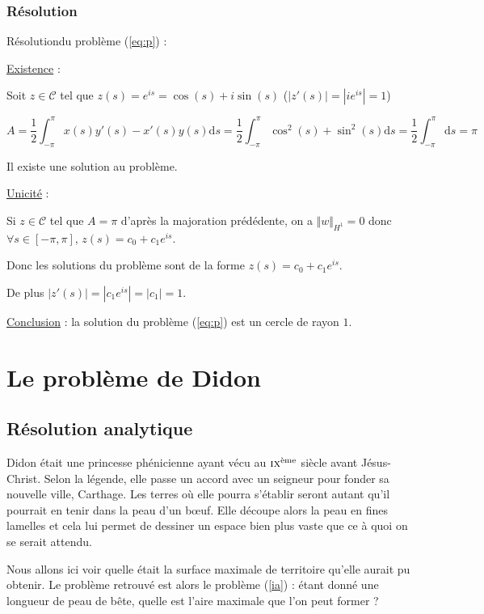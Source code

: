 \documentclass[10pt,a4paper]{article}
\renewcommand{\d}{\mathrm{d}}
\theoremstyle{plain}
\theoremstyle{definition}
\begin{document}
\subsubsection{Résolution}

Résolutiondu problème (\ref{eq:p}) :

\underline{Existence} :

Soit $z \in \mathcal{C}$ tel que $z(s)=e^{is} = \cos(s)+i\sin(s)$ ($|z'(s)|=|ie^{is}|=1$)

\[ A = \frac{1}{2} \int_{-\pi}^{\pi}{ x(s)y'(s) - x'(s)y(s) \d s } = \frac{1}{2} \int_{-\pi}^{\pi}{ \cos^2(s) + \sin^2(s) \d s } = \frac{1}{2} \int_{-\pi}^{\pi}{ \d s } = \pi \]

Il existe une solution au problème.

\underline{Unicité} :

Si $z \in \mathcal{C}$ tel que $A=\pi$ d'après la majoration prédédente, on a $\Vert w\Vert_{H^1}=0$ donc $\forall s\in [-\pi,\pi]$, $z(s) = c_0+c_1e^{is}$.

Donc les solutions du problème sont de la forme $z(s) = c_0+c_1e^{is}$.

De plus $|z'(s)|=|c_1e^{is}| = |c_1| = 1$.

\underline{Conclusion} : la solution du problème (\ref{eq:p}) est un cercle de rayon $1$. 

\section{Le problème de Didon}
\label{sec:didon}

\subsection{Résolution analytique}

Didon était une princesse phénicienne ayant vécu au $\textsc{ix}^\text{ème}$ siècle avant Jésus-Christ. Selon la légende, elle passe un accord avec un seigneur pour fonder sa nouvelle ville, Carthage. Les terres où elle pourra s'établir seront \og autant qu'il pourrait en tenir dans la peau d'un b\oe{}uf\fg{}. Elle découpe alors la peau en fines lamelles et cela lui permet de dessiner un espace bien plus vaste que ce à quoi on se serait attendu.

Nous allons ici voir quelle était la surface maximale de territoire qu'elle aurait pu obtenir. Le problème retrouvé est alors le problème (\ref{ia}) : étant donné une longueur de peau de bête, quelle est l'aire maximale que l'on peut former ?
\end{document}
